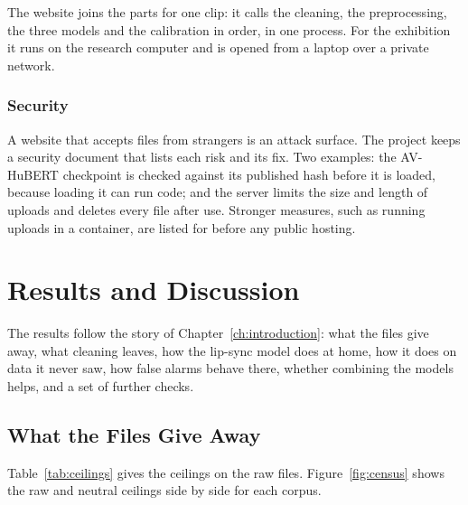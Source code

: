 The website joins the parts for one clip: it calls the cleaning, the
preprocessing, the three models and the calibration in order, in one process.
For the exhibition it runs on the research computer and is opened from a
laptop over a private network.

\subsection{Security}

A website that accepts files from strangers is an attack surface. The
project keeps a security document that lists each risk and its fix. Two
examples: the AV-HuBERT checkpoint is checked against its published hash
before it is loaded, because loading it can run code; and the server limits
the size and length of uploads and deletes every file after use. Stronger
measures, such as running uploads in a container, are listed for before any
public hosting.

%
\chapter{Results and Discussion}
\label{ch:results}

The results follow the story of Chapter~\ref{ch:introduction}: what the files
give away, what cleaning leaves, how the lip-sync model does at home, how it
does on data it never saw, how false alarms behave there, whether combining
the models helps, and a set of further checks.

\section{What the Files Give Away}
\label{sec:r-files}

Table~\ref{tab:ceilings} gives the ceilings on the raw files.
Figure~\ref{fig:census} shows the raw and neutral ceilings side by side for
each corpus.


